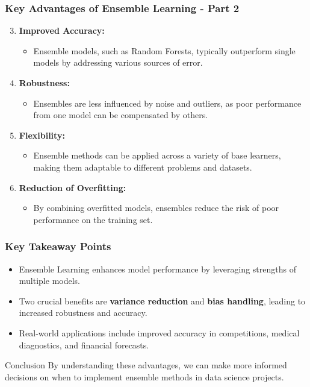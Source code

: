 \documentclass[aspectratio=169]{beamer}
\begin{document}
\begin{frame}[fragile]
    \frametitle{Key Advantages of Ensemble Learning - Part 2}
    \begin{enumerate}
        \setcounter{enumi}{2}
        \item \textbf{Improved Accuracy:}
            \begin{itemize}
                \item Ensemble models, such as Random Forests, typically outperform single models by addressing various sources of error.
            \end{itemize}
        
        \item \textbf{Robustness:}
            \begin{itemize}
                \item Ensembles are less influenced by noise and outliers, as poor performance from one model can be compensated by others.
            \end{itemize}
        
        \item \textbf{Flexibility:}
            \begin{itemize}
                \item Ensemble methods can be applied across a variety of base learners, making them adaptable to different problems and datasets.
            \end{itemize}
        
        \item \textbf{Reduction of Overfitting:}
            \begin{itemize}
                \item By combining overfitted models, ensembles reduce the risk of poor performance on the training set.
            \end{itemize}
    \end{enumerate}
\end{frame}

\begin{frame}[fragile]
    \frametitle{Key Takeaway Points}
    \begin{itemize}
        \item Ensemble Learning enhances model performance by leveraging strengths of multiple models.
        \item Two crucial benefits are \textbf{variance reduction} and \textbf{bias handling}, leading to increased robustness and accuracy.
        \item Real-world applications include improved accuracy in competitions, medical diagnostics, and financial forecasts.
    \end{itemize}
    \begin{block}{Conclusion}
        By understanding these advantages, we can make more informed decisions on when to implement ensemble methods in data science projects.
    \end{block}
\end{frame}
\end{document}
